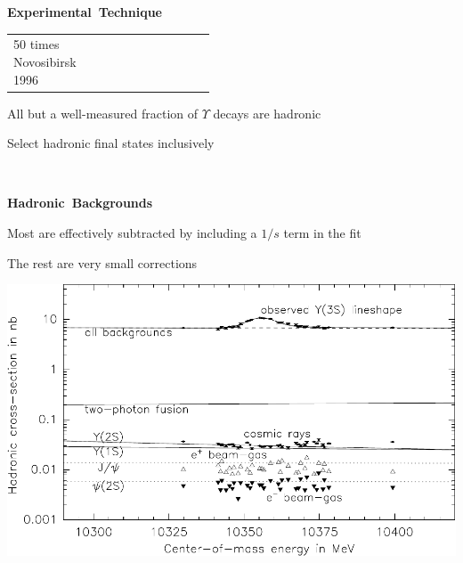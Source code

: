 \documentclass[landscape]{article}
\newenvironment{slide}[1][ ]{\mbox{\bf #1 } \vfill}{\vfill \mbox{ } \pagebreak}
\begin{document}
\begin{slide}[Experimental Technique]
\begin{center}
\begin{tabular}{p{0.45\linewidth} p{0.5 cm} p{0.45\linewidth}}
\begin{minipage}{\linewidth}
	50 times Novosibirsk 1996
	
    \end{minipage}
  \end{tabular}
\end{center}

\vspace{1 cm}

All but a well-measured fraction of $\Upsilon$ decays are hadronic

\vspace{0.5 cm}

Select hadronic final states inclusively

\vspace{-1 cm}

\end{slide}

\begin{slide}[Hadronic Backgrounds]

\vspace{0.5 cm}
Most are effectively subtracted by including a $1/s$ term in the fit

\vspace{0.5 cm}
The rest are very small corrections

\vspace{0.5 cm}

\begin{center}
  \includegraphics[width=0.9\linewidth]{../notau_backgrounds_6}
\end{center}

\vspace{-1 cm}

\end{slide}
\end{document}
